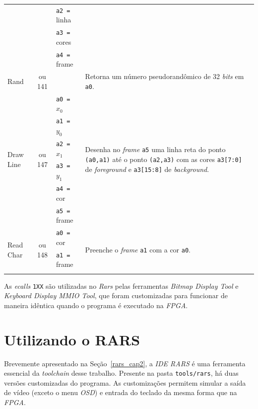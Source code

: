 \begin{longtable}{|l|c|p{3cm}|l |}
            & & \texttt{a2 =} linha       & \\*
            & & \texttt{a3 =} cores       & \\*
            & & \texttt{a4 =} frame       & \\
        \hline
        \multirow{3}{*}{Rand}               & \multirow{3}{*}{\parbox{0.6cm}{ ou 141}}
            & & \multirow{3}{*}{\parbox{7cm}{Retorna um número pseudorandômico de 32 \textit{bits} em \texttt{a0}.}}\\*
            & & & \\*
            & & & \\
        \hline
        \multirow{6}{*}{Draw Line}          & \multirow{6}{*}{\parbox{0.6cm}{ ou 147}}
              & \texttt{a0 =} $x_0$       & \multirow{6}{*}{\parbox{7cm}{Desenha no \textit{frame} \texttt{a5} uma linha reta do ponto \texttt{(a0,a1)} até o ponto \texttt{(a2,a3)}
                                                com as cores \texttt{a3[7:0]} de \textit{foreground} e \texttt{a3[15:8]} de \textit{background}.}}\\*
            & & \texttt{a1 =} $y_0$       & \\*
            & & \texttt{a2 =} $x_1$       & \\*
            & & \texttt{a3 =} $y_1$       & \\*
            & & \texttt{a4 =} cor         & \\*
            & & \texttt{a5 =} frame       & \\
        \hline
        \multirow{3}{*}{Read Char}          & \multirow{3}{*}{\parbox{0.6cm}{ ou 148}}
            & \texttt{a0 =} cor           & \multirow{3}{*}{\parbox{7cm}{Preenche o \textit{frame} \texttt{a1} com a cor \texttt{a0}.}}\\*
            & & \texttt{a1 =} frame       & \\*
            & & & \\
        \hline
    \end{longtable}

    { As \textit{ecalls} \texttt{1XX} são utilizadas no \textit{Rars} pelas
        ferramentas \textit{Bitmap Display Tool} e \textit{Keyboard Display MMIO
        Tool}, que foram customizadas para funcionar de maneira idêntica quando
        o programa é executado na \textit{FPGA}.
    }


    \section{Utilizando o RARS}
    { Brevemente apresentado na Seção~\ref{rars_cap2}, a \textit{IDE RARS} é uma
        ferramenta essencial da \textit{toolchain} desse trabalho. Presente na
        pasta \texttt{tools/rars}, há duas versões customizadas do programa.
        As customizações permitem simular a saída de vídeo (exceto o menu \textit{OSD})
        e entrada do teclado da mesma forma que na \textit{FPGA}.
    }

